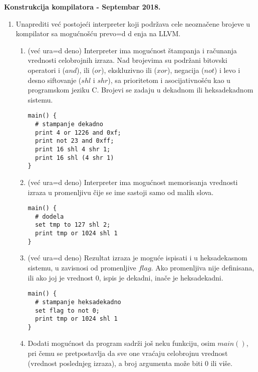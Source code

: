 \documentclass[a4paper]{article}
\def\dj{\leavevmode\setbox0=\hbox{d}\kern0pt
 \rlap{\kern.215em\raise.46\ht0\hbox{-}}d}
\begin{document}
\begin{center}
\textbf{Konstrukcija kompilatora - Septembar 2018.}\\
\end{center}

\begin{enumerate}

\item Unaprediti ve\' c postoje\' ci interpreter koji podr\v zava cele
  neozna\v cene brojeve u kompilator sa mogu\' cno\v s\' cu prevo\dj
  enja na LLVM.

\begin{enumerate}

\item (ve\' c ura\dj eno) Interpreter ima mogu\' cnost \v stampanja i ra\v cunanja
  vrednosti celobrojnih izraza. Nad brojevima su podr\v zani bitovski
  operatori i ($and$), ili ($or$), ekskluzivno ili ($xor$), negacija
  ($not$) i levo i desno siftovanje ($shl$ i $shr$), sa prioritetom i
  asocijativno\v s\' cu kao u programskom jeziku C. Brojevi se zadaju
  u dekadnom ili heksadekadnom sistemu.

\begin{verbatim}
main() {
  # stampanje dekadno
  print 4 or 1226 and 0xf;
  print not 23 and 0xff;
  print 16 shl 4 shr 1;
  print 16 shl (4 shr 1)
}
\end{verbatim}

\item (ve\' c ura\dj eno) Interpreter ima mogu\' cnost memorisanja vrednosti izraza u
  promenljivu \v cije se ime sastoji samo od malih slova.
\begin{verbatim}
main() {
  # dodela
  set tmp to 127 shl 2;
  print tmp or 1024 shl 1
}
\end{verbatim}

\item (ve\' c ura\dj eno) Rezultat izraza je mogu\' ce ispisati i u heksadekasnom sistemu,
  u zavisnosi od promenljive $flag$. Ako promenljiva nije definisana,
  ili ako joj je vrednost 0, ispis je dekadni, ina\v ce je
  heksadekadni.

\begin{verbatim}
main() {
  # stampanje heksadekadno
  set flag to not 0;
  print tmp or 1024 shl 1
}
\end{verbatim}

\item Dodati mogu\' cnost da program sadr\v zi jo\v s neku funkciju,
  osim $main()$, pri \v cemu se pretpostavlja da sve one vra\' caju
  celobrojnu vrednost (vrednost poslednjeg izraza), a broj argumenta
  mo\v ze biti $0$ ili vi\v se.
  

\end{enumerate}
\end{enumerate}
\end{document}
